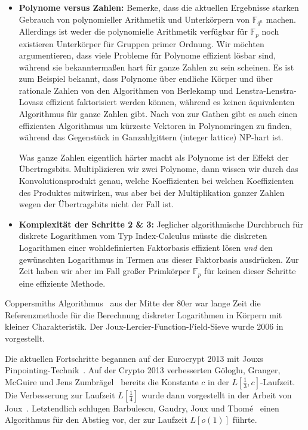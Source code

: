 \begin{refsegment}
\begin{itemize}
\item{\bf Polynome versus Zahlen:} Bemerke, dass die aktuellen Ergebnisse starken Gebrauch von polynomieller Arithmetik und Unterkörpern von $\mathbb{F}_{q^n}$ machen. Allerdings ist weder die polynomielle Arithmetik verfügbar für $\mathbb{F}_p$ noch existieren Unterkörper für Gruppen primer Ordnung. Wir möchten argumentieren, dass viele Probleme für Polynome effizient lösbar sind, während sie bekanntermaßen hart für ganze Zahlen zu sein scheinen. Es ist zum Beispiel bekannt, dass Polynome über endliche Körper und über rationale Zahlen von den Algorithmen von Berlekamp und Lenstra-Lenstra-Lovasz effizient faktorisiert werden können, während es keinen äquivalenten Algorithmus für ganze Zahlen gibt. Nach von zur Gathen gibt es auch einen effizienten Algorithmus um kürzeste Vektoren in Polynomringen zu finden, während das Gegenstück in Ganzahlgittern (integer lattice) NP-hart ist.

Was ganze Zahlen eigentlich härter macht als Polynome ist der Effekt der Übertragsbits. Multiplizieren wir zwei Polynome, dann wissen wir durch das Konvolutionsprodukt genau, welche Koeffizienten bei welchen Koeffizienten des Produktes mitwirken, was aber bei der Multiplikation ganzer Zahlen wegen der Übertragsbits nicht der Fall ist.

\item{\bf Komplexität der Schritte 2 \& 3:} Jeglicher algorithmische Durchbruch für diskrete Logarithmen vom Typ Index-Calculus müsste die diskreten Logarithmen einer wohldefinierten Faktorbasis effizient lösen {\em und} den gewünschten Logarithmus in Termen aus dieser Faktorbasis ausdrücken. Zur Zeit haben wir aber im Fall großer Primkörper $\mathbb{F}_p$ für keinen dieser Schritte eine effiziente Methode.
\end{itemize}

Coppersmiths Algorithmus~\cite{Coppersmith1984} aus der Mitte der 80er war lange Zeit die Referenzmethode für die Berechnung diskreter Logarithmen in Körpern mit kleiner Charakteristik. Der Joux-Lercier-Function-Field-Sieve wurde 2006 in~\cite{JL2006} vorgestellt.

Die aktuellen Fortschritte begannen auf der Eurocrypt 2013 mit Jouxs Pinpointing-Tech\-nik~\cite{Pin2013}. Auf der Crypto 2013 verbesserten G\"ologlu, Granger, McGuire und Jens Zumbr\"agel~\cite{GGMZ2013} bereits die Konstante $c$ in der $L[\frac 1 3,c]$-Laufzeit. Die Verbesserung zur Laufzeit $L[\frac 1 4]$ wurde dann vorgestellt in der Arbeit von Joux~\cite{Joux2013}. Letztendlich schlugen Barbulescu, Gaudry, Joux und Thom{\'e}~\cite{BGJT2013} einen Algorithmus für den Abstieg vor, der zur Laufzeit $L[o(1)]$ führte.



\end{refsegment}
